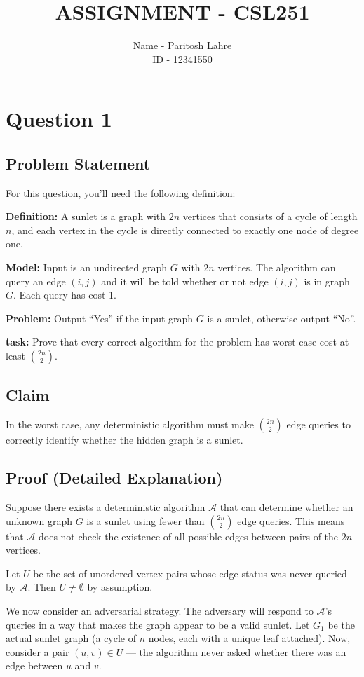 \documentclass[12pt]{article}
\title{ASSIGNMENT - CSL251}
\author{Name - Paritosh Lahre \\ ID - 12341550}
\date{}
\begin{document}
	
	\maketitle
	
	\section*{Question 1}
	
	\subsection*{Problem Statement}
	For this question, you’ll need the following definition:
	
	\textbf{Definition:} A sunlet is a graph with $2n$ vertices that consists of a cycle of length $n$, and each vertex in the cycle is directly connected to exactly one node of degree one.
	
	\textbf{Model:} Input is an undirected graph $G$ with $2n$ vertices. The algorithm can query an edge $(i, j)$ and it will be told whether or not edge $(i, j)$ is in graph $G$. Each query has cost 1.
	
	\textbf{Problem:} Output ``Yes'' if the input graph $G$ is a sunlet, otherwise output ``No''.
	
	\textbf{task:} Prove that every correct algorithm for the problem has worst-case cost at least $\binom{2n}{2}$.
	
	\subsection*{Claim}
	In the worst case, any deterministic algorithm must make $\binom{2n}{2}$ edge queries to correctly identify whether the hidden graph is a sunlet.
	
	\subsection*{Proof (Detailed Explanation)}
	Suppose there exists a deterministic algorithm $\mathcal{A}$ that can determine whether an unknown graph $G$ is a sunlet using fewer than $\binom{2n}{2}$ edge queries. This means that $\mathcal{A}$ does not check the existence of all possible edges between pairs of the $2n$ vertices.
	
	Let $U$ be the set of unordered vertex pairs whose edge status was never queried by $\mathcal{A}$. Then $U \neq \emptyset$ by assumption.
	
	We now consider an adversarial strategy. The adversary will respond to $\mathcal{A}$'s queries in a way that makes the graph appear to be a valid sunlet. Let $G_1$ be the actual sunlet graph (a cycle of $n$ nodes, each with a unique leaf attached). Now, consider a pair $(u,v) \in U$ — the algorithm never asked whether there was an edge between $u$ and $v$.
	
\end{document}
